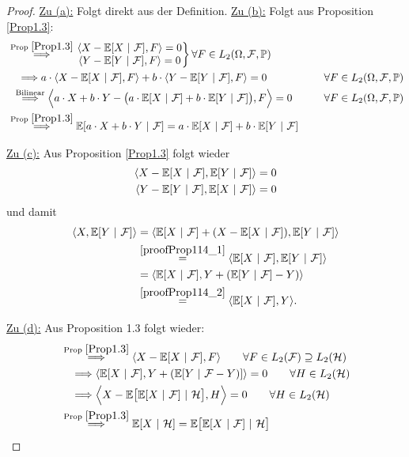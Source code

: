 \begin{proof}
\underline{Zu (a):} Folgt direkt aus der Definition.\nl
\underline{Zu (b):} Folgt aus Proposition \ref{Prop1.3}:
\begin{align*}
&\stackrel{\text{Prop }\ref{Prop1.3}}{\Longrightarrow}
\left.
\begin{matrix}
\langle X-\mathbb{E}[X~|~\mathcal{F}],F\rangle=0\\
\langle Y-\mathbb{E}[Y~|~\mathcal{F}],F\rangle=0
\end{matrix}
\right\rbrace\forall F\in L_2(\Omega,\mathcal{F},\mathbb{P})\\
&~~~\Longrightarrow
a\cdot\langle X-\mathbb{E}[X~|~\mathcal{F}],F\rangle+b\cdot\langle Y-\mathbb{E}[Y~|~\mathcal{F}],F\rangle=0\qquad&\forall F\in L_2(\Omega,\mathcal{F},\mathbb{P})\\
&~\,\stackrel{\text{Bilinear}}{\Longrightarrow}
\Big\langle a\cdot X+b\cdot Y-\big(a\cdot\mathbb{E}[X~|~\mathcal{F}]+b\cdot \mathbb{E}[Y~|~\mathcal{F}]\big),F\Big\rangle=0\qquad&\forall F\in L_2(\Omega,\mathcal{F},\mathbb{P})\\
&\stackrel{\text{Prop }\ref{Prop1.3}}{\Longrightarrow}
\mathbb{E}[a\cdot X+b\cdot Y~|~\mathcal{F}]=a\cdot \mathbb{E}[X~|~\mathcal{F}]+b\cdot \mathbb{E}[Y~|~\mathcal{F}]
\end{align*}

\underline{Zu (c):} Aus Proposition \ref{Prop1.3} folgt wieder
\begin{align}
\langle X-\mathbb{E}[X~|~\mathcal{F}],\mathbb{E}[Y~|~\mathcal{F}]\rangle=0\label{proofProp114_1}\\
\langle Y-\mathbb{E}[Y~|~\mathcal{F}],\mathbb{E}[X~|~\mathcal{F}]\rangle=0\label{proofProp114_2}
\end{align}
und damit
\begin{align*}
\langle X,\mathbb{E}[Y~|~\mathcal{F}]\rangle
&=\langle \mathbb{E}[X~|~\mathcal{F}]+(X-\mathbb{E}[X~|~\mathcal{F}]),\mathbb{E}[Y~|~\mathcal{F}]\rangle\\
&\stackrel{\ref{proofProp114_1}}{=}
\langle\mathbb{E}[X~|~\mathcal{F}],\mathbb{E}[Y~|~\mathcal{F}]\rangle\\
&=\langle\mathbb{E}[X~|~\mathcal{F}],Y+(\mathbb{E}[Y~|~\mathcal{F}]-Y)\rangle\\
&\stackrel{\ref{proofProp114_2}}{=}
\langle\mathbb{E}[X~|~\mathcal{F}],Y\rangle.
\end{align*}

\underline{Zu (d):} 
Aus Proposition 1.3 folgt wieder:
\begin{align*}
&\stackrel{\text{Prop }\ref{Prop1.3}}{\Longrightarrow}
\langle X-\mathbb{E}[X~|~\mathcal{F}],F\rangle\qquad\forall F\in L_2(\mathcal{F})\supseteq L_2(\mathcal{H})\\
&~~~\Longrightarrow
\langle \mathbb{E}[X~|~\mathcal{F}],Y+(\mathbb{E}[Y~|~\mathcal{F}-Y)]\rangle=0\qquad\forall H\in L_2(\mathcal{H})\\
&~~~\Longrightarrow
\Big\langle X-\mathbb{E}\big[\mathbb{E}[X~|~\mathcal{F}]~|~\mathcal{H}\big],H\Big\rangle=0\qquad\forall H\in L_2(\mathcal{H})\\
&\stackrel{\text{Prop }\ref{Prop1.3}}{\Longrightarrow}
\mathbb{E}[X~|~\mathcal{H}]=\mathbb{E}\big[\mathbb{E}[X~|~\mathcal{F}]~|~\mathcal{H}\big]
\end{align*}


\end{proof}
